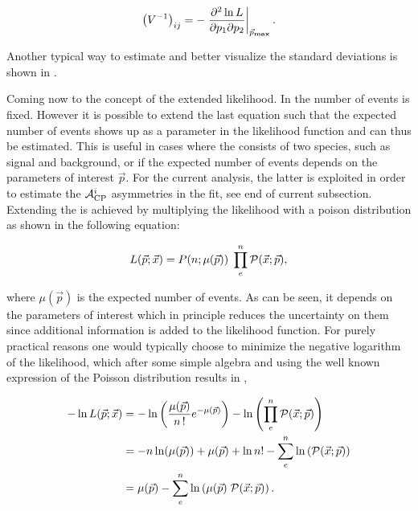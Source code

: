 \begin{equation}
  \centering
\left( V^{-1} \right)_{ij} = - \left. \frac{\partial^2\ln L}{\partial p_1 \partial p_2} \right|_{ \vec{p}_{\rm\bf max}}.
\label{covariance}
\end{equation}

\noindent Another typical way to estimate and better visualize the standard deviations is shown in .

Coming now to the concept of the extended likelihood. In  the number of events is fixed. However it is possible to
extend the last equation such that the expected number of events shows up as a parameter in the likelihood function and can thus be estimated.
This is useful in cases where the \pdf consists of two species, such as signal and background, or if the expected number of events depends on the
parameters of interest $\vec{p}$. For the current analysis, the latter is exploited in order to estimate the $\mathcal{A}_{\rm CP}^{i}$ asymmetries in the fit,
see end of current subsection. Extending the \pdf is achieved by multiplying the likelihood with a poison distribution as shown in the following equation:

\begin{equation}
  \centering
L(\vec{p};\vec{x}) = P(n;\expEvnts) \; \prod_e^n \mathcal{P}(\vec{x};\vec{p}),
\label{extlikelihood}
\end{equation}

\noindent where $\mu(\vec{p})$ is the expected number of events. As can be seen, it depends on the parameters of interest which in
principle reduces the uncertainty on them since additional information is added to the likelihood function.
For purely practical reasons one would typically choose to minimize the negative logarithm of the likelihood, which after some simple
algebra and using the well known expression of the Poisson distribution results in ,

\begin{align}
  \centering
  -\nll &= -\ln\left( \frac{\expEvnts}{n\,!} e^{-\expEvnts } \right) - \ln\left( \prod_e^n \mathcal{P}(\vec{x};\vec{p}) \right)  \nonumber \\
        &= - n\ln(\expEvnts) + \expEvnts  + \ln n! - \sum_e^n \ln\parenthesis{\mathcal{P}(\vec{x};\vec{p})} \nonumber \\
        &=  \expEvnts  - \sum_e^n \ln\parenthesis{\expEvnts \; \mathcal{P}(\vec{x};\vec{p}) }.
\label{extloglikelihood}
\end{align}

